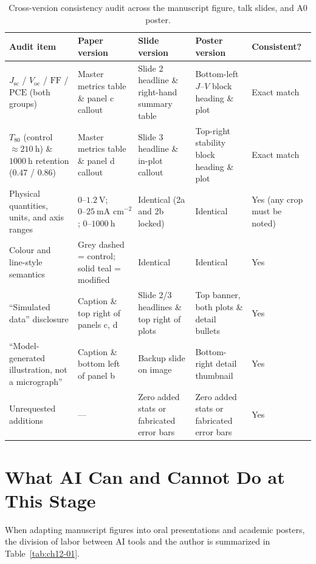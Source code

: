 \begin{table}[htbp]\centering\footnotesize
\setlength{\tabcolsep}{3pt}
\renewcommand{\arraystretch}{1.15}
\caption{Cross-version consistency audit across the manuscript figure, talk slides, and A0 poster.}\label{tab:ch12-02}
\begin{tabularx}{\linewidth}{@{}>{\raggedright\arraybackslash}p{26mm}YYY>{\raggedright\arraybackslash}p{18mm}@{}}
\toprule
\textbf{Audit item} & \textbf{Paper version} & \textbf{Slide version} & \textbf{Poster version} & \textbf{Consistent?} \\
\midrule
$J_{\text{sc}}$ / $V_{\text{oc}}$ / $\text{FF}$ / $\text{PCE}$ (both groups) & Master metrics table \& panel c callout & Slide 2 headline \& right-hand summary table & Bottom-left $J\text{--}V$ block heading \& plot & Exact match \\
$T_{80}$ (control $\approx 210\ \text{h}$) \& $1000\ \text{h}$ retention ($0.47$ / $0.86$) & Master metrics table \& panel d callout & Slide 3 headline \& in-plot callout & Top-right stability block heading \& plot & Exact match \\
Physical quantities, units, and axis ranges & $0\text{--}1.2\ \text{V}$; $0\text{--}25\ \text{mA cm}^{-2}$; $0\text{--}1000\ \text{h}$ & Identical (2a and 2b locked) & Identical & Yes (any crop must be noted) \\
Colour and line-style semantics & Grey dashed = control; solid teal = modified & Identical & Identical & Yes \\
``Simulated data'' disclosure & Caption \& top right of panels c, d & Slide 2/3 headlines \& top right of plots & Top banner, both plots \& detail bullets & Yes \\
``Model-generated illustration, not a micrograph'' & Caption \& bottom left of panel b & Backup slide on image & Bottom-right detail thumbnail & Yes \\
Unrequested additions & --- & Zero added stats or fabricated error bars & Zero added stats or fabricated error bars & Yes \\
\bottomrule
\end{tabularx}
\end{table}

\section{What AI Can and Cannot Do at This Stage}

When adapting manuscript figures into oral presentations and academic posters, the division of labor between AI tools and the author is summarized in Table~\ref{tab:ch12-01}.

